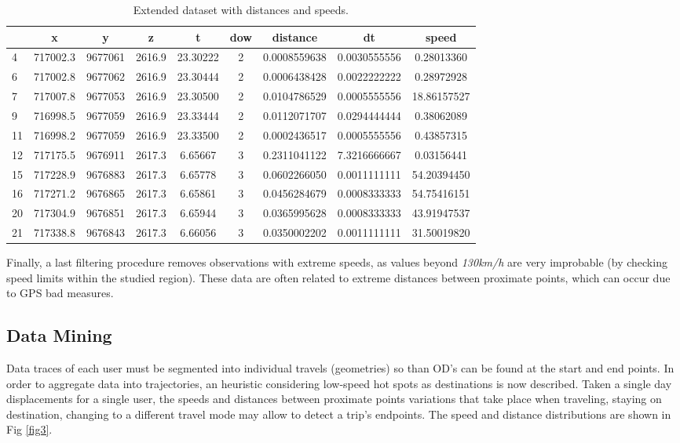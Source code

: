 \documentclass[runningheads]{llncs}
\begin{document}
\begin{table}

\caption{\label{tab:load-speeds}\label{tab2}Extended dataset with distances and speeds.}
\centering
\begin{tabular}[t]{l|c|c|c|c|c|c|c|c}
\hline
  & x & y & z & t & dow & distance & dt & speed\\
\hline
4 & 717002.3 & 9677061 & 2616.9 & 23.30222 & 2 & 0.0008559638 & 0.0030555556 & 0.28013360\\
\hline
6 & 717002.8 & 9677062 & 2616.9 & 23.30444 & 2 & 0.0006438428 & 0.0022222222 & 0.28972928\\
\hline
7 & 717007.8 & 9677053 & 2616.9 & 23.30500 & 2 & 0.0104786529 & 0.0005555556 & 18.86157527\\
\hline
9 & 716998.5 & 9677059 & 2616.9 & 23.33444 & 2 & 0.0112071707 & 0.0294444444 & 0.38062089\\
\hline
11 & 716998.2 & 9677059 & 2616.9 & 23.33500 & 2 & 0.0002436517 & 0.0005555556 & 0.43857315\\
\hline
12 & 717175.5 & 9676911 & 2617.3 & 6.65667 & 3 & 0.2311041122 & 7.3216666667 & 0.03156441\\
\hline
15 & 717228.9 & 9676883 & 2617.3 & 6.65778 & 3 & 0.0602266050 & 0.0011111111 & 54.20394450\\
\hline
16 & 717271.2 & 9676865 & 2617.3 & 6.65861 & 3 & 0.0456284679 & 0.0008333333 & 54.75416151\\
\hline
20 & 717304.9 & 9676851 & 2617.3 & 6.65944 & 3 & 0.0365995628 & 0.0008333333 & 43.91947537\\
\hline
21 & 717338.8 & 9676843 & 2617.3 & 6.66056 & 3 & 0.0350002202 & 0.0011111111 & 31.50019820\\
\hline
\end{tabular}
\end{table}

Finally, a last filtering procedure removes observations with extreme speeds, as values beyond \emph{130km/h} are very improbable (by checking speed limits within the studied region). These data are often related to extreme distances between proximate points, which can occur due to GPS bad measures.

\hypertarget{data-mining}{%
\subsection{Data Mining}\label{data-mining}}

Data traces of each user must be segmented into individual travels (geometries) so than OD's can be found at the start and end points. In order to aggregate data into trajectories, an heuristic considering low-speed hot spots as destinations is now described. Taken a single day displacements for a single user, the speeds and distances between proximate points variations that take place when traveling, staying on destination, changing to a different travel mode may allow to detect a trip's endpoints. The speed and distance distributions are shown in Fig \ref{fig3}.
\end{document}
